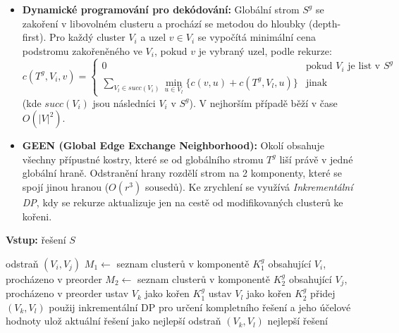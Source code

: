 \documentclass[12pt,a4paper]{article}
\theoremstyle{definition}
\begin{document}
\begin{itemize}
    \item \textbf{Dynamické programování pro dekódování:} Globální strom $S^g$ se zakoření v libovolném clusteru a prochází se metodou do hloubky (depth-first). Pro každý cluster $V_i$ a uzel $v \in V_i$ se vypočítá minimální cena podstromu zakořeněného ve $V_i$, pokud $v$ je vybraný uzel, podle rekurze:
    \begin{equation}
        c(T^g, V_i, v) = 
        \begin{cases} 
        0 & \text{pokud } V_i \text{ je list v } S^g \\
        \sum_{V_l \in succ(V_i)} \min_{u \in V_l} \{ c(v,u) + c(T^g, V_l, u) \} & \text{jinak}
        \end{cases}
    \end{equation}
    (kde $succ(V_i)$ jsou následníci $V_i$ v $S^g$). V nejhorším případě běží v čase $O(|V|^2)$.
    
    \item \textbf{GEEN (Global Edge Exchange Neighborhood):} Okolí obsahuje všechny přípustné kostry, které se od globálního stromu $T^g$ liší právě v jedné globální hraně. Odstranění hrany rozdělí strom na 2 komponenty, které se spojí jinou hranou ($O(r^3)$ sousedů). Ke zrychlení se využívá \textit{Inkrementální DP}, kdy se rekurze aktualizuje jen na cestě od modifikovaných clusterů ke kořeni.
\end{itemize}

\begin{algorithm}[H]
\caption{Exploration of GEEN}
\textbf{Vstup:} řešení $S$
\begin{algorithmic}[1]
\STATE odstraň $(V_i, V_j)$
\STATE $M_1 \gets$ seznam clusterů v komponentě $K_1^g$ obsahující $V_i$, procházeno v preorder
\STATE $M_2 \gets$ seznam clusterů v komponentě $K_2^g$ obsahující $V_j$, procházeno v preorder
\STATE ustav $V_k$ jako kořen $K_1^g$
\STATE ustav $V_l$ jako kořen $K_2^g$
\STATE přidej $(V_k, V_l)$
\STATE použij inkrementální DP pro určení kompletního řešení a jeho účelové hodnoty
\STATE ulož aktuální řešení jako nejlepší
\ENDIF
\STATE odstraň $(V_k, V_l)$
\ENDFOR
\ENDFOR
\ENDFOR
\RETURN nejlepší řešení
\end{algorithmic}
\end{algorithm}
\end{document}

